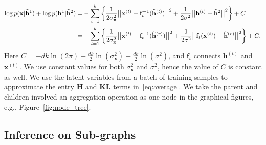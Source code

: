 \documentclass{article} %
\begin{document}
\begin{align}\notag
\log p(\mathbf{x}|\widehat{\mathbf{h}}^1) + \log p(\mathbf{h}^1|\widehat{\mathbf{h}}^2)
=&-\sum_{t=1}^k\bigg\{ \frac{1}{2\sigma^2_{\mathbf{x}}}\big|\big| \mathbf{x}^{(t)} - \mathbf{f}_t^{-1}(\widehat{\mathbf{h}}^{(t)})\big|\big|^2 +  \frac{1}{2\sigma^2}\big|\big| \mathbf{h}^{(t)} -\widehat{\mathbf{h}}^2 \big|\big|^2 \bigg\} +C \\
=&-\sum_{t=1}^k\bigg\{ \frac{1}{2\sigma^2_{\mathbf{x}}}\big|\big| \mathbf{x}^{(t)} - \mathbf{f}_t^{-1}(\widehat{\mathbf{h}}^{(r)})\big|\big|^2 +  \frac{1}{2\sigma^2}\big|\big|  \mathbf{f}_t(\mathbf{x}^{(t)}) - \widehat{\mathbf{h}}^{(r)}\big|\big|^2 \bigg\} +C \label{eq:yllk} .
\end{align} 
Here $C=-dk\ln(2\pi)-\frac{dk}{2}\ln(\sigma_{\mathbf{x}}^2)-\frac{dk}{2}\ln(\sigma^2)$, and $\mathbf{f}_t$ connects $\mathbf{h}^{(t)}$ and $\mathbf{x}^{(t)}$. We use constant values for both  $\sigma^2_{\mathbf{x}}$ and $\sigma^2$, hence the value of $C$ is constant as well. We use the latent variables from a batch of training samples to approximate the entry \textbf{H} and \textbf{KL} terms in~\eqref{eq:average}. We take the parent and children involved an aggregation operation as one node in the graphical figures, e.g., Figure~\ref{fig:node_tree}. 

\subsection{Inference on Sub-graphs }
\end{document}
